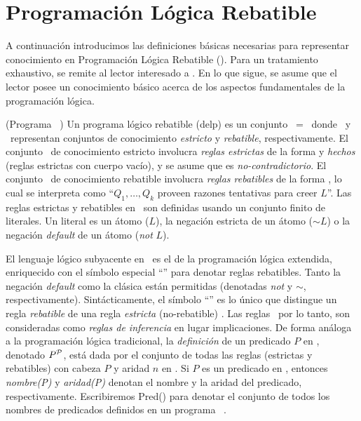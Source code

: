 \section{Programación Lógica Rebatible}

\label{sec:preliminaresDelp}


A continuación introducimos las definiciones básicas necesarias para representar conocimiento
en Programación Lógica Rebatible (\DLP). Para un tratamiento exhaustivo, se remite al lector
interesado a \cite{Garcia:2004a}. En lo que sigue, se asume que el lector posee un conocimiento básico acerca de los aspectos
fundamentales de la programación lógica. 

\begin{definicion}(Programa \DLP\ \PP)
	Un programa lógico rebatible (delp) es un conjunto \PP\ = \SD\ donde \SSet\ y \DD\ representan conjuntos
	de conocimiento \textit{estricto} y \textit{rebatible}, respectivamente. El conjunto \SSet\ de 
	conocimiento estricto involucra \textit{reglas estrictas} de la forma  y 					\textit{hechos} (reglas estrictas con cuerpo vacío), y se asume que es \textit{no-contradictorio}. 
	El conjunto \DD\ de conocimiento rebatible involucra \textit{reglas rebatibles} de la forma 
	, lo cual se interpreta como ``$Q_1,\ldots,Q_k$ proveen razones tentativas 
	para creer $L$''. Las reglas estrictas y rebatibles en \DLP\ son definidas usando un conjunto 
	finito de literales. Un literal es un átomo ($L$), la negación estricta de un átomo ($\sim L$) o 
	la negación \textit{default} de un átomo (\textit{not} $L$).
\end{definicion}

El lenguaje lógico subyacente en \DLP\ es el de la programación lógica extendida, %
enriquecido con el símbolo especial ``\drule{}{}'' para denotar reglas rebatibles. Tanto la negación 
\textit{default} como la clásica están permitidas (denotadas \textit{not} y \textit{$\sim$}, respectivamente).
Sintácticamente, el símbolo ``\drule{}{}'' es lo único que distingue un regla \textit{rebatible} 
 de una regla \textit{estricta} (no-rebatible) . 
Las reglas \DLP\, por lo tanto, son consideradas como \textit{reglas de inferencia} en lugar implicaciones.
De forma análoga a la programación lógica tradicional, la \textit{definición} de un predicado $P$ en \PP ,
denotado $P^{\scriptsize{\mbox{${\mathcal P}$}}}$, está dada por el conjunto de todas las reglas (estrictas y rebatibles) con cabeza $P$ 
y aridad $n$ en \PP . Si $P$ es un predicado en \PP , entonces \textit{nombre(P)} y \textit{aridad(P)} denotan
el nombre y la aridad del predicado, respectivamente. Escribiremos \textsf{Pred}(\PP) para denotar el conjunto
de todos los nombres de predicados definidos en un programa \DLP\ \PP.

